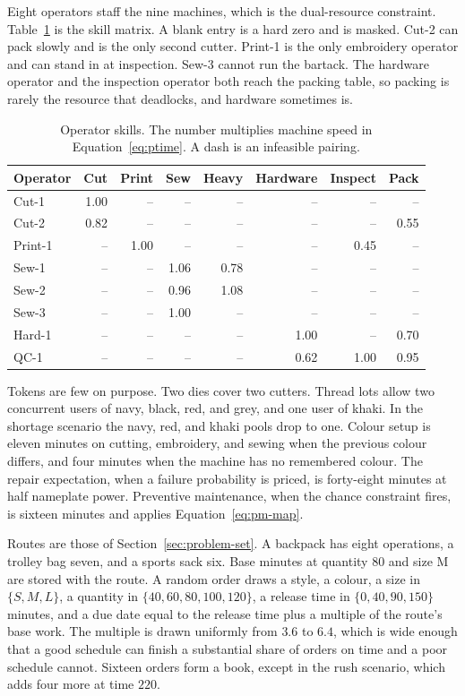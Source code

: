 Eight operators staff the nine machines, which is the dual-resource constraint. Table~\ref{tab:operators} is the skill matrix. A blank entry is a hard zero and is masked. Cut-2 can pack slowly and is the only second cutter. Print-1 is the only embroidery operator and can stand in at inspection. Sew-3 cannot run the bartack. The hardware operator and the inspection operator both reach the packing table, so packing is rarely the resource that deadlocks, and hardware sometimes is.

\begin{table}[ht]
\centering
\caption{Operator skills. The number multiplies machine speed in Equation~\eqref{eq:ptime}. A dash is an infeasible pairing.}
\label{tab:operators}
\small
\begin{tabular}{lrrrrrrr}
\toprule
Operator & Cut & Print & Sew & Heavy & Hardware & Inspect & Pack \\
\midrule
Cut-1 & 1.00 & -- & -- & -- & -- & -- & -- \\
Cut-2 & 0.82 & -- & -- & -- & -- & -- & 0.55 \\
Print-1 & -- & 1.00 & -- & -- & -- & 0.45 & -- \\
Sew-1 & -- & -- & 1.06 & 0.78 & -- & -- & -- \\
Sew-2 & -- & -- & 0.96 & 1.08 & -- & -- & -- \\
Sew-3 & -- & -- & 1.00 & -- & -- & -- & -- \\
Hard-1 & -- & -- & -- & -- & 1.00 & -- & 0.70 \\
QC-1 & -- & -- & -- & -- & 0.62 & 1.00 & 0.95 \\
\bottomrule
\end{tabular}
\end{table}

Tokens are few on purpose. Two dies cover two cutters. Thread lots allow two concurrent users of navy, black, red, and grey, and one user of khaki. In the shortage scenario the navy, red, and khaki pools drop to one. Colour setup is eleven minutes on cutting, embroidery, and sewing when the previous colour differs, and four minutes when the machine has no remembered colour. The repair expectation, when a failure probability is priced, is forty-eight minutes at half nameplate power. Preventive maintenance, when the chance constraint fires, is sixteen minutes and applies Equation~\eqref{eq:pm-map}.

Routes are those of Section~\ref{sec:problem-set}. A backpack has eight operations, a trolley bag seven, and a sports sack six. Base minutes at quantity 80 and size M are stored with the route. A random order draws a style, a colour, a size in \(\{S,M,L\}\), a quantity in \(\{40,60,80,100,120\}\), a release time in \(\{0,40,90,150\}\) minutes, and a due date equal to the release time plus a multiple of the route's base work. The multiple is drawn uniformly from \(3.6\) to \(6.4\), which is wide enough that a good schedule can finish a substantial share of orders on time and a poor schedule cannot. Sixteen orders form a book, except in the rush scenario, which adds four more at time \(220\).

